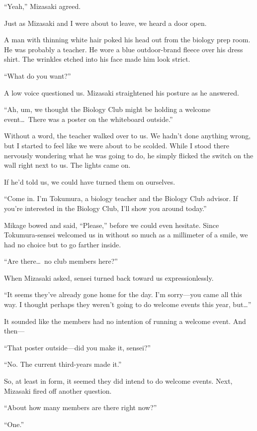 \documentclass[
    a4paper,
    12pt,
    twoside,
    openany,
    UTF8,
    fontset=windows
]{ctexbook}
\begin{document}
``Yeah,'' Mizasaki agreed.

Just as Mizasaki and I were about to leave, we heard a door open.

A man with thinning white hair poked his head out from the biology prep room. He was probably a teacher. He wore a blue outdoor-brand fleece over his dress shirt. The wrinkles etched into his face made him look strict.

``What do you want?''

A low voice questioned us. Mizasaki straightened his posture as he answered.

``Ah, um, we thought the Biology Club might be holding a welcome event\dots\ There was a poster on the whiteboard outside.''

Without a word, the teacher walked over to us. We hadn't done anything wrong, but I started to feel like we were about to be scolded. While I stood there nervously wondering what he was going to do, he simply flicked the switch on the wall right next to us. The lights came on.

If he'd told us, we could have turned them on ourselves.

``Come in. I'm Tokumura, a biology teacher and the Biology Club advisor. If you're interested in the Biology Club, I'll show you around today.''

Mikage bowed and said, ``Please,'' before we could even hesitate. Since Tokumura-sensei welcomed us in without so much as a millimeter of a smile, we had no choice but to go farther inside.

``Are there\dots\ no club members here?''

When Mizasaki asked, sensei turned back toward us expressionlessly.

``It seems they've already gone home for the day. I'm sorry---you came all this way. I thought perhaps they weren't going to do welcome events this year, but\dots''

It sounded like the members had no intention of running a welcome event. And then---

``That poster outside---did you make it, sensei?''

``No. The current third-years made it.''

So, at least in form, it seemed they did intend to do welcome events. Next, Mizasaki fired off another question.

``About how many members are there right now?''

``One.''
\end{document}

